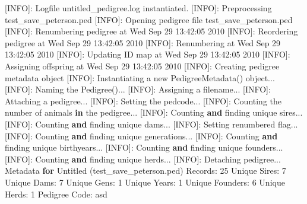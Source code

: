 \documentclass[
  letterpaper,
  DIV=11,
  numbers=noendperiod]{scrreprt}
\newenvironment{Shaded}{\begin{snugshade}}{\end{snugshade}}
\newcommand{\BuiltInTok}[1]{\textcolor[rgb]{0.00,0.23,0.31}{#1}}
\newcommand{\ControlFlowTok}[1]{\textcolor[rgb]{0.00,0.23,0.31}{\textbf{#1}}}
\newcommand{\DecValTok}[1]{\textcolor[rgb]{0.68,0.00,0.00}{#1}}
\newcommand{\ErrorTok}[1]{\textcolor[rgb]{0.68,0.00,0.00}{#1}}
\newcommand{\KeywordTok}[1]{\textcolor[rgb]{0.00,0.23,0.31}{\textbf{#1}}}
\newcommand{\NormalTok}[1]{\textcolor[rgb]{0.00,0.23,0.31}{#1}}
\begin{document}
\begin{Shaded}
\begin{Highlighting}[]
\NormalTok{[INFO]: Logfile untitled\_pedigree.log instantiated.}
\NormalTok{[INFO]: Preprocessing test\_save\_peterson.ped}
\NormalTok{[INFO]: Opening pedigree }\BuiltInTok{file}\NormalTok{ test\_save\_peterson.ped}
\NormalTok{        [INFO]: Renumbering pedigree at Wed Sep }\DecValTok{29} \DecValTok{13}\NormalTok{:}\DecValTok{42}\NormalTok{:}\DecValTok{0}\ErrorTok{5} \DecValTok{2010}
\NormalTok{                [INFO]: Reordering pedigree at Wed Sep }\DecValTok{29} \DecValTok{13}\NormalTok{:}\DecValTok{42}\NormalTok{:}\DecValTok{0}\ErrorTok{5} \DecValTok{2010}
\NormalTok{                [INFO]: Renumbering at Wed Sep }\DecValTok{29} \DecValTok{13}\NormalTok{:}\DecValTok{42}\NormalTok{:}\DecValTok{0}\ErrorTok{5} \DecValTok{2010}
\NormalTok{                [INFO]: Updating ID }\BuiltInTok{map}\NormalTok{ at Wed Sep }\DecValTok{29} \DecValTok{13}\NormalTok{:}\DecValTok{42}\NormalTok{:}\DecValTok{0}\ErrorTok{5} \DecValTok{2010}
\NormalTok{        [INFO]: Assigning offspring at Wed Sep }\DecValTok{29} \DecValTok{13}\NormalTok{:}\DecValTok{42}\NormalTok{:}\DecValTok{0}\ErrorTok{5} \DecValTok{2010}
\NormalTok{[INFO]: Creating pedigree metadata }\BuiltInTok{object}
\NormalTok{        [INFO]:  Instantiating a new PedigreeMetadata() }\BuiltInTok{object}\NormalTok{...}
\NormalTok{        [INFO]:  Naming the Pedigree()...}
\NormalTok{        [INFO]:  Assigning a filename...}
\NormalTok{        [INFO]:  Attaching a pedigree...}
\NormalTok{        [INFO]:  Setting the pedcode...}
\NormalTok{        [INFO]:  Counting the number of animals }\KeywordTok{in}\NormalTok{ the pedigree...}
\NormalTok{        [INFO]:  Counting }\KeywordTok{and}\NormalTok{ finding unique sires...}
\NormalTok{        [INFO]:  Counting }\KeywordTok{and}\NormalTok{ finding unique dams...}
\NormalTok{        [INFO]:  Setting renumbered flag...}
\NormalTok{        [INFO]:  Counting }\KeywordTok{and}\NormalTok{ finding unique generations...}
\NormalTok{        [INFO]:  Counting }\KeywordTok{and}\NormalTok{ finding unique birthyears...}
\NormalTok{        [INFO]:  Counting }\KeywordTok{and}\NormalTok{ finding unique founders...}
\NormalTok{        [INFO]:  Counting }\KeywordTok{and}\NormalTok{ finding unique herds...}
\NormalTok{        [INFO]:  Detaching pedigree...}
\NormalTok{Metadata }\ControlFlowTok{for}\NormalTok{ Untitled (test\_save\_peterson.ped)}
\NormalTok{        Records:                }\DecValTok{25}
\NormalTok{        Unique Sires:           }\DecValTok{7}
\NormalTok{        Unique Dams:            }\DecValTok{7}
\NormalTok{        Unique Gens:            }\DecValTok{1}
\NormalTok{        Unique Years:           }\DecValTok{1}
\NormalTok{        Unique Founders:        }\DecValTok{6}
\NormalTok{        Unique Herds:           }\DecValTok{1}
\NormalTok{        Pedigree Code:          asd}
\end{Highlighting}
\end{Shaded}
\end{document}
